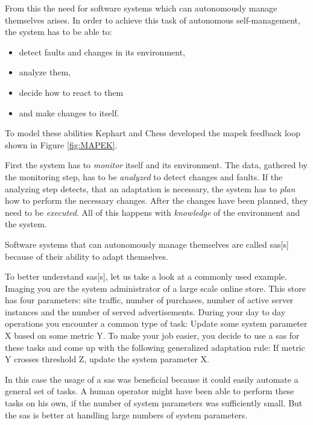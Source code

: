 \noindent From this the need for software systems which can autonomously manage themselves arises.
In order to achieve this task of autonomous self-management, the system has to be able to:
\begin{itemize}[nosep]
    \item detect faults and changes in its environment,
    \item analyze them,
    \item decide how to react to them
    \item and make changes to itself.
\end{itemize}

\noindent To model these abilities Kephart and Chess developed
the \acrfull{mapek} feedback loop \cite*{VisionOfAutonomicComputing} shown in Figure \ref{fig:MAPEK}.

\noindent First the system has to \textit{monitor} itself and its environment.
The data, gathered by the monitoring step, has to be \textit{analyzed} to detect changes and faults.
If the analyzing step detects, that an adaptation is necessary,
the system has to \textit{plan} how to perform the necessary changes.
After the changes have been planned, they need to be \textit{executed}.
All of this happens with \textit{knowledge} of the environment and the system.

\noindent Software systems that can autonomously manage themselves are called \acrfull{sas}[s]
because of their ability to adapt themselves.

\noindent To better understand \acrlong{sas}[s], let us take a look at a commonly used example.
Imaging you are the system administrator of a large scale online store.
This store has four parameters: site traffic, number of purchases, number of active server instances and the number of served advertisements.
During your day to day operations you encounter a common type of task:
Update some system parameter X based on some metric Y.
To make your job easier, you decide to use a \acrlong{sas} for these tasks
and come up with the following generalized adaptation rule:
If metric Y crosses threshold Z, update the system parameter X.

\noindent In this case the usage of a \acrshort{sas} was beneficial because it could easily
automate a general set of tasks.
A human operator might have been able to perform these tasks on his own,
if the number of system parameters was sufficiently small.
But the \acrshort{sas} is better at handling large numbers of system parameters.


